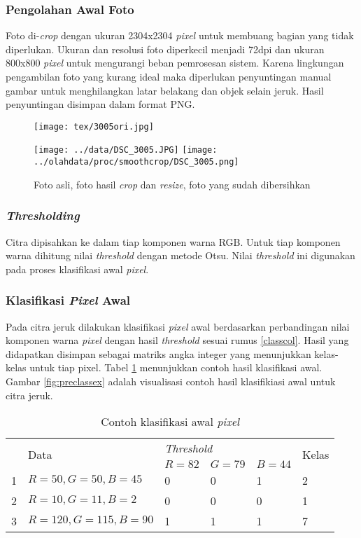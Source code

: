 \documentclass[laporan.tex]{subfiles}
\begin{document}
\subsubsection{Pengolahan Awal Foto}

Foto di-\emph{crop} dengan ukuran 2304x2304 \emph{pixel} untuk membuang bagian yang tidak diperlukan. Ukuran dan resolusi foto diperkecil menjadi 72dpi dan ukuran 800x800 \emph{pixel} untuk mengurangi beban pemrosesan sistem. Karena lingkungan pengambilan foto yang kurang ideal maka diperlukan penyuntingan manual gambar untuk menghilangkan latar belakang dan objek selain jeruk. Hasil penyuntingan disimpan dalam format PNG.

\begin{figure}[h]
\centering
\texttt{[image: tex/3005ori.jpg]}

\vskip 1cm
\texttt{[image: ../data/DSC\_3005.JPG]} \qquad
\texttt{[image: ../olahdata/proc/smoothcrop/DSC\_3005.png]}
\caption{Foto asli, foto hasil \emph{crop} dan \emph{resize}, foto yang sudah dibersihkan}
\end{figure}

\subsubsection{\emph{Thresholding}}

Citra dipisahkan ke dalam tiap komponen warna RGB. Untuk tiap komponen warna dihitung nilai \emph{threshold} dengan metode Otsu. Nilai \emph{threshold} ini digunakan pada proses klasifikasi awal \emph{pixel}.


\subsubsection{Klasifikasi \emph{Pixel} Awal}

Pada citra jeruk dilakukan klasifikasi \emph{pixel} awal berdasarkan perbandingan nilai komponen warna \emph{pixel} dengan hasil \emph{threshold} sesuai rumus \ref{classcol}. Hasil yang didapatkan disimpan sebagai matriks angka integer yang menunjukkan kelas-kelas untuk tiap pixel. Tabel \ref{table:preclass3} menunjukkan contoh hasil klasifikasi awal. Gambar \ref{fig:preclassex} adalah visualisasi contoh hasil klasifikiasi awal untuk citra jeruk.

\begin{table}[h]
\centering
\begin{tabular}{|l|l|l|l|l|l|}
\cline{1-6}
\multirow{2}{*}{} & \multirow{2}{*}{Data} & \multicolumn{3}{l|}{\emph{Threshold}} & \multirow{2}{*}{Kelas} \\
\cline{3-5}
 & & $R=82$ & $G=79$ & $B=44$ & \\
\cline{1-6}
1 & $R=50, G=50, B=45$ & 0 & 0 & 1 & 2 \\
2 & $R=10, G=11, B=2$ & 0 & 0 & 0 & 1 \\
3 & $R=120, G=115, B=90$ & 1 & 1 & 1 & 7 \\
\cline{1-6}
\end{tabular}
\caption{Contoh klasifikasi awal \emph{pixel}}
\label{table:preclass3}
\end{table}
\end{document}
